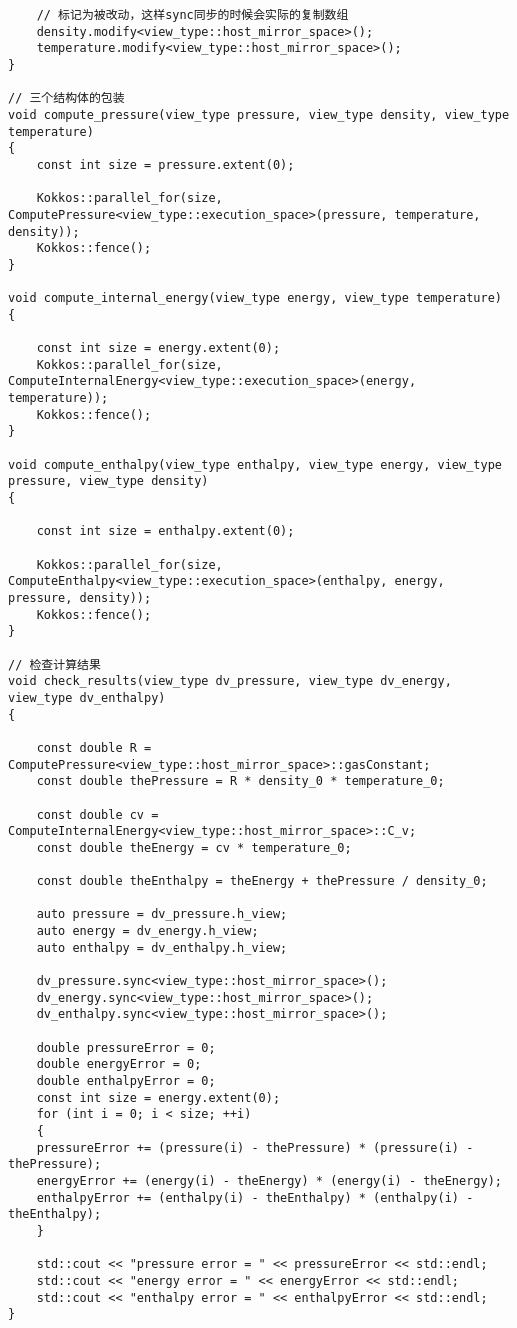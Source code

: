 \begin{lstlisting}
    // 标记为被改动，这样sync同步的时候会实际的复制数组
    density.modify<view_type::host_mirror_space>();
    temperature.modify<view_type::host_mirror_space>();
}

// 三个结构体的包装
void compute_pressure(view_type pressure, view_type density, view_type temperature)
{
    const int size = pressure.extent(0);

    Kokkos::parallel_for(size, ComputePressure<view_type::execution_space>(pressure, temperature, density));
    Kokkos::fence();
}

void compute_internal_energy(view_type energy, view_type temperature)
{

    const int size = energy.extent(0);
    Kokkos::parallel_for(size, ComputeInternalEnergy<view_type::execution_space>(energy, temperature));
    Kokkos::fence();
}

void compute_enthalpy(view_type enthalpy, view_type energy, view_type pressure, view_type density)
{

    const int size = enthalpy.extent(0);

    Kokkos::parallel_for(size, ComputeEnthalpy<view_type::execution_space>(enthalpy, energy, pressure, density));
    Kokkos::fence();
}

// 检查计算结果
void check_results(view_type dv_pressure, view_type dv_energy, view_type dv_enthalpy)
{

    const double R = ComputePressure<view_type::host_mirror_space>::gasConstant;
    const double thePressure = R * density_0 * temperature_0;

    const double cv = ComputeInternalEnergy<view_type::host_mirror_space>::C_v;
    const double theEnergy = cv * temperature_0;

    const double theEnthalpy = theEnergy + thePressure / density_0;

    auto pressure = dv_pressure.h_view;
    auto energy = dv_energy.h_view;
    auto enthalpy = dv_enthalpy.h_view;

    dv_pressure.sync<view_type::host_mirror_space>();
    dv_energy.sync<view_type::host_mirror_space>();
    dv_enthalpy.sync<view_type::host_mirror_space>();

    double pressureError = 0;
    double energyError = 0;
    double enthalpyError = 0;
    const int size = energy.extent(0);
    for (int i = 0; i < size; ++i)
    {
    pressureError += (pressure(i) - thePressure) * (pressure(i) - thePressure);
    energyError += (energy(i) - theEnergy) * (energy(i) - theEnergy);
    enthalpyError += (enthalpy(i) - theEnthalpy) * (enthalpy(i) - theEnthalpy);
    }

    std::cout << "pressure error = " << pressureError << std::endl;
    std::cout << "energy error = " << energyError << std::endl;
    std::cout << "enthalpy error = " << enthalpyError << std::endl;
}
\end{lstlisting}